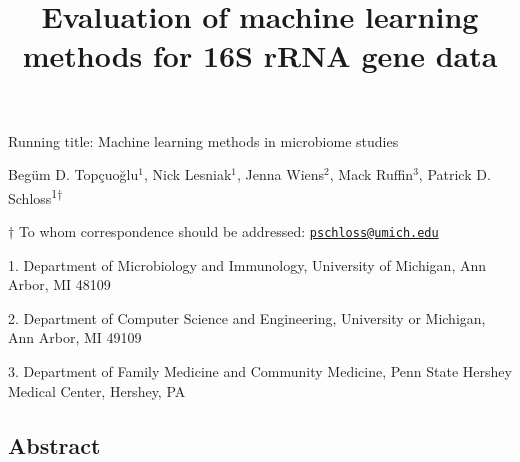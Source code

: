 \documentclass[11pt,]{article}
\title{\textbf{Evaluation of machine learning methods for 16S rRNA gene data}}
\author{}
\date{}
\begin{document}
\maketitle

\vspace{35mm}

Running title: Machine learning methods in microbiome studies

\vspace{35mm}

Begüm D. Topçuoğlu\({^1}\), Nick Lesniak\({^1}\), Jenna Wiens\({^2}\),
Mack Ruffin\({^3}\), Patrick D. Schloss\textsuperscript{1\(\dagger\)}

\vspace{40mm}

\(\dagger\) To whom correspondence should be addressed:
\href{mailto:pschloss@umich.edu}{\nolinkurl{pschloss@umich.edu}}

1. Department of Microbiology and Immunology, University of Michigan,
Ann Arbor, MI 48109

2. Department of Computer Science and Engineering, University or
Michigan, Ann Arbor, MI 49109

3. Department of Family Medicine and Community Medicine, Penn State
Hershey Medical Center, Hershey, PA

\newpage

\linenumbers

\subsection{Abstract}\label{abstract}
\end{document}
